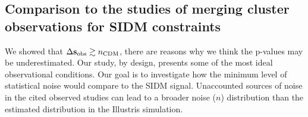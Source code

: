 
 
  
\subsection{Comparison to the studies of merging cluster observations for SIDM
constraints}
\label{subsec:limitation_of_pvalue}
We showed that $\Delta {\bf s}_{\rm obs} \gtrsim n_{\rm CDM}$, there are
reasons why we think the p-values may be underestimated.
Our study, by design, presents some of the most ideal observational conditions. 
Our goal is to investigate how the minimum level of statistical noise would 
compare to the SIDM signal.
Unaccounted sources of noise in the cited observed studies  
can lead to a broader noise ($n$) distribution than the estimated distribution in the
Illustris simulation. 

